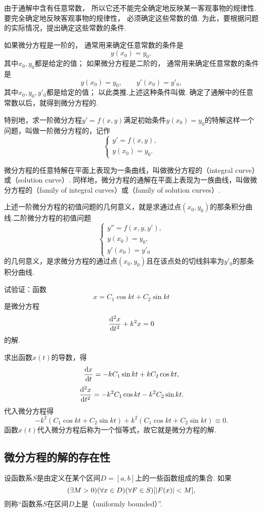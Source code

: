 由于通解中含有任意常数，
所以它还不能完全确定地反映某一客观事物的规律性.
要完全确定地反映客观事物的规律性，
必须确定这些常数的值.
为此，要根据问题的实际情况，提出确定这些常数的条件.

如果微分方程是一阶的，
通常用来确定任意常数的条件是\[
y(x_0) = y_0,
\]其中\(x_0,y_0\)都是给定的值；
如果微分方程是二阶的，
通常用来确定任意常数的条件是\[
y(x_0) = y_0,
\qquad
y'(x_0) = y'_0,
\]其中\(x_0,y_0,y'_0\)都是给定的值；
以此类推.上述这种条件叫做.
确定了通解中的任意常数以后，就得到微分方程的.

特别地，求一阶微分方程\(y'=f(x,y)\)满足初始条件\(y(x_0) = y_0\)的特解这样一个问题，叫做一阶微分方程的，记作\[
\left\{ \begin{array}{l}
y' = f(x,y), \\
y(x_0) = y_0.
\end{array} \right.
\]

微分方程的任意特解在平面上表现为一条曲线，叫做微分方程的（integral curve）或（solution curve）.
同样地，微分方程的通解在平面上表现为一族曲线，叫做微分方程的（family of integral curves）或（family of solution curves）.

上述一阶微分方程的初值问题的几何意义，就是求通过点\((x_0,y_0)\)的那条积分曲线.二阶微分方程的初值问题\[
\left\{ \begin{array}{l}
y'' = f(x,y,y'), \\
y(x_0) = y_0, \\
y'(x_0) = y'_0
\end{array} \right.
\]的几何意义，是求微分方程的通过点\((x_0,y_0)\)且在该点处的切线斜率为\(y'_0\)的那条积分曲线.

\begin{example}
试验证：函数\[
x = C_1 \cos kt + C_2 \sin kt
\]是微分方程\[
\dv[2]{x}{t} + k^2 x = 0
\]的解.
\begin{solution}
求出函数\(x(t)\)的导数，得\[
\dv{x}{t} = -k C_1 \sin kt + k C_2 \cos kt,
\]\[
\dv[2]{x}{t} = -k^2 C_1 \cos kt - k^2 C_2 \sin kt.
\]代入微分方程得\[
-k^2 (C_1 \cos kt + C_2 \sin kt) + k^2 (C_1 \cos kt + C_2 \sin kt)
\equiv 0.
\]
函数\(x(t)\)代入微分方程后称为一个恒等式，故它就是微分方程的解.
\end{solution}
\end{example}

\subsection{微分方程的解的存在性}
\begin{definition}\label{definition:微分方程.函数系的一致有界性}
设函数系\(S\)是由定义在某个区间\(D = [a,b]\)上的一些函数组成的集合.
如果\[
	(\exists M>0)
	(\forall x \in D)
	(\forall F \in S)
	[\abs{F(x)} < M],
\]
则称“函数系\(S\)在区间\(D\)上是（uniformly bounded）”.
\end{definition}

